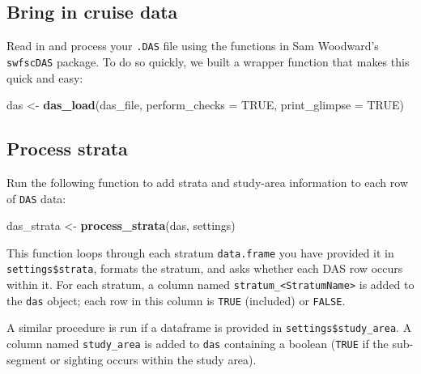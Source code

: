 \documentclass[
]{book}
\newenvironment{Shaded}{\begin{snugshade}}{\end{snugshade}}
\newcommand{\DataTypeTok}[1]{\textcolor[rgb]{0.13,0.29,0.53}{#1}}
\newcommand{\KeywordTok}[1]{\textcolor[rgb]{0.13,0.29,0.53}{\textbf{#1}}}
\newcommand{\NormalTok}[1]{#1}
\newcommand{\OtherTok}[1]{\textcolor[rgb]{0.56,0.35,0.01}{#1}}
\newcommand{\StringTok}[1]{\textcolor[rgb]{0.31,0.60,0.02}{#1}}
\begin{document}
\hypertarget{bring-in-cruise-data}{%
\subsection*{Bring in cruise data}\label{bring-in-cruise-data}}

Read in and process your \texttt{.DAS} file using the functions in Sam Woodward's \texttt{swfscDAS} package. To do so quickly, we built a wrapper function that makes this quick and easy:

\begin{Shaded}
\begin{Highlighting}[]
\NormalTok{das <-}\StringTok{ }\KeywordTok{das_load}\NormalTok{(das_file, }
                \DataTypeTok{perform_checks =} \OtherTok{TRUE}\NormalTok{,}
                \DataTypeTok{print_glimpse =} \OtherTok{TRUE}\NormalTok{)}
\end{Highlighting}
\end{Shaded}

\hypertarget{process-strata}{%
\subsection*{Process strata}\label{process-strata}}

Run the following function to add strata and study-area information to each row of \texttt{DAS} data:

\begin{Shaded}
\begin{Highlighting}[]
\NormalTok{das_strata <-}\StringTok{ }\KeywordTok{process_strata}\NormalTok{(das, settings)}
\end{Highlighting}
\end{Shaded}

This function loops through each stratum \texttt{data.frame} you have provided it in \texttt{settings\$strata}, formats the stratum, and asks whether each DAS row occurs within it. For each stratum, a column named \texttt{stratum\_\textless{}StratumName\textgreater{}} is added to the \texttt{das} object; each row in this column is \texttt{TRUE} (included) or \texttt{FALSE}.

A similar procedure is run if a dataframe is provided in \texttt{settings\$study\_area}. A column named \texttt{study\_area} is added to \texttt{das} containing a boolean (\texttt{TRUE} if the sub-segment or sighting occurs within the study area).
\end{document}
